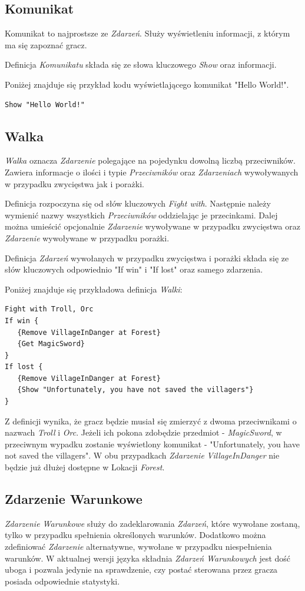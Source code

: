 \documentclass[openright]{xmgr}
\begin{document}
\subsection{Komunikat}
Komunikat to najprostsze ze \textit{Zdarzeń}. Służy wyświetleniu informacji, z którym ma się zapoznać gracz.

Definicja \textit{Komunikatu} składa się ze słowa kluczowego \textit{Show} oraz informacji.

Poniżej znajduje się przykład kodu wyświetlającego komunikat "Hello World!".
\begin{verbatim}
Show "Hello World!"
\end{verbatim}

\subsection{Walka}
\textit{Walka} oznacza \textit{Zdarzenie} polegające na pojedynku dowolną liczbą przeciwników. Zawiera informacje o ilości i typie \textit{Przeciwników} oraz \textit{Zdarzeniach} wywoływanych w przypadku zwycięstwa jak i porażki.

Definicja rozpoczyna się od słów kluczowych \textit{Fight with}. Następnie należy wymienić nazwy wszystkich \textit{Przeciwników} oddzielając je przecinkami. Dalej można umieścić opcjonalnie \textit{Zdarzenie} wywoływane w przypadku zwycięstwa oraz \textit{Zdarzenie} wywoływane w przypadku porażki.

Definicja \textit{Zdarzeń} wywołanych w przypadku zwycięstwa i porażki składa się ze słów kluczowych odpowiednio "If win" i "If lost" oraz samego zdarzenia.

Poniżej znajduje się przykładowa definicja \textit{Walki}:
\begin{verbatim}
Fight with Troll, Orc
If win {
   {Remove VillageInDanger at Forest}
   {Get MagicSword}
}
If lost {
   {Remove VillageInDanger at Forest}
   {Show "Unfortunately, you have not saved the villagers"}
}
\end{verbatim}

Z definicji wynika, że gracz będzie musiał się zmierzyć z dwoma przeciwnikami o nazwach \textit{Troll} i \textit{Orc}. Jeżeli ich pokona zdobędzie przedmiot - \textit{MagicSword}, w przeciwnym wypadku zostanie wyświetlony komunikat - "Unfortunately, you have not saved the villagers". W obu przypadkach \textit{Zdarzenie} \textit{VillageInDanger} nie będzie już dłużej dostępne w Lokacji \textit{Forest}.

\subsection{Zdarzenie Warunkowe}
\textit{Zdarzenie Warunkowe} służy do zadeklarowania \textit{Zdarzeń}, które wywołane zostaną, tylko w przypadku spełnienia określonych warunków. Dodatkowo można zdefiniować \textit{Zdarzenie} alternatywne, wywołane w przypadku niespełnienia warunków. W aktualnej wersji języka składnia \textit{Zdarzeń Warunkowych} jest dość uboga i pozwala jedynie na sprawdzenie, czy postać sterowana przez gracza posiada odpowiednie statystyki.
\end{document}
